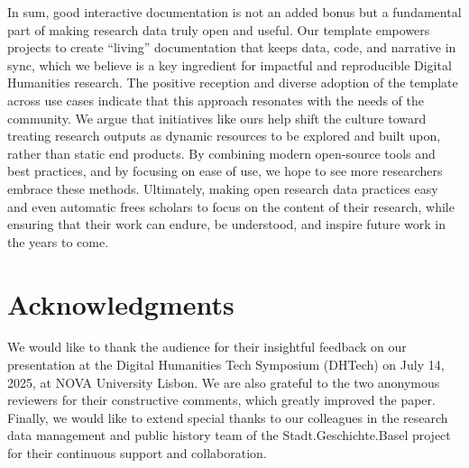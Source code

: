 \documentclass[final]{anthology-ch} %
\begin{document}
In sum, good interactive documentation is not an added bonus but a fundamental part of making research data truly open and useful. Our template empowers projects to create ``living'' documentation that keeps data, code, and narrative in sync, which we believe is a key ingredient for impactful and reproducible Digital Humanities research. The positive reception and diverse adoption of the template across use cases indicate that this approach resonates with the needs of the community. We argue that initiatives like ours help shift the culture toward treating research outputs as dynamic resources to be explored and built upon, rather than static end products. By combining modern open-source tools and best practices, and by focusing on ease of use, we hope to see more researchers embrace these methods. Ultimately, making open research data practices easy and even automatic frees scholars to focus on the content of their research, while ensuring that their work can endure, be understood, and inspire future work in the years to come.

\section*{Acknowledgments}

We would like to thank the audience for their insightful feedback on our presentation at the Digital Humanities Tech Symposium (DHTech) on July 14, 2025, at NOVA University Lisbon. We are also grateful to the two anonymous reviewers for their constructive comments, which greatly improved the paper. Finally, we would like to extend special thanks to our colleagues in the research data management and public history team of the Stadt.Geschichte.Basel project for their continuous support and collaboration.

\printbibliography



\end{document}
